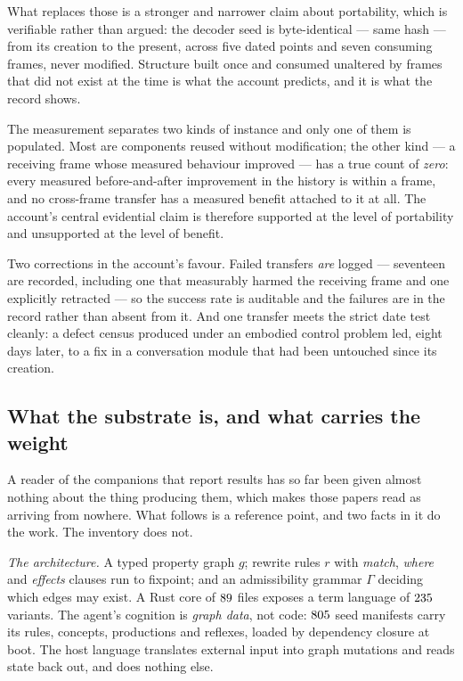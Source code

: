 \documentclass[11pt,a4paper]{article}
\begin{document}
What replaces those is a stronger and narrower claim about portability, which is verifiable rather than
argued: the decoder seed is byte-identical --- same hash --- from its creation to the present, across
five dated points and seven consuming frames, never modified. Structure built once and consumed
unaltered by frames that did not exist at the time is what the account predicts, and it is what the
record shows.

The measurement separates two kinds of instance and only one of them is populated. Most are
components reused without modification; the other kind --- a receiving frame whose measured behaviour
improved --- has a true count of \emph{zero}: every measured
before-and-after improvement in the history is within a frame, and no cross-frame transfer has a
measured benefit attached to it at all. The account's central evidential claim is therefore supported at
the level of portability and unsupported at the level of benefit.

Two corrections in the account's favour. Failed transfers \emph{are} logged --- seventeen are recorded,
including one that measurably harmed the receiving frame and one explicitly retracted --- so the
success rate is auditable and the failures are in the record rather than absent from it. And one
transfer meets the strict date test cleanly: a defect census produced under an embodied control problem
led, eight days later, to a fix in a conversation module that had been untouched since its creation.

\subsection{What the substrate is, and what carries the weight}\label{sec:substrate-size}
A reader of the companions that report results has so far been given almost nothing about the thing
producing them, which makes those papers read as arriving from nowhere. What follows is a reference
point, and two facts in it do the work. The inventory does not.

\emph{The architecture.} A typed property graph $g$; rewrite rules $r$ with \emph{match}, \emph{where}
and \emph{effects} clauses run to fixpoint; and an admissibility grammar $\Gamma$ deciding which edges
may exist. A Rust core of $89$ files exposes a term language of $235$ variants. The agent's
cognition is \emph{graph data}, not code: $805$ seed manifests carry its rules, concepts, productions and
reflexes, loaded by dependency closure at boot. The host language translates external input into graph
mutations and reads state back out, and does nothing else.
\end{document}
